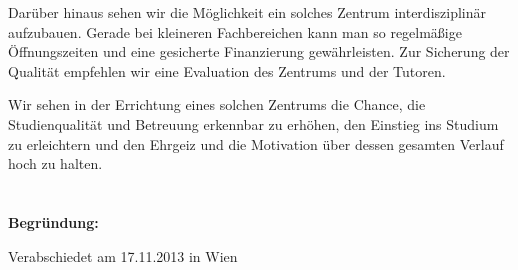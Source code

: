 \documentclass[DIV=calc]{scrartcl}
\begin{document}
Darüber hinaus sehen wir die Möglichkeit ein solches Zentrum interdisziplinär aufzubauen. Gerade bei kleineren Fachbereichen kann man so regelmäßige Öffnungszeiten und eine gesicherte Finanzierung gewährleisten. 
Zur Sicherung der Qualität empfehlen wir eine Evaluation des Zentrums und der Tutoren. 

Wir sehen in der Errichtung eines solchen Zentrums die Chance, die Studienqualität und Betreuung erkennbar zu erhöhen, den Einstieg ins Studium zu erleichtern und den Ehrgeiz und die Motivation über dessen gesamten Verlauf hoch zu halten.

\vspace{1cm}
\section*{}


\vspace{1cm}
\textbf{Begründung:}\\




\vfill
\begin{flushright}
Verabschiedet am 17.11.2013 in Wien
\end{flushright}
\end{document}
